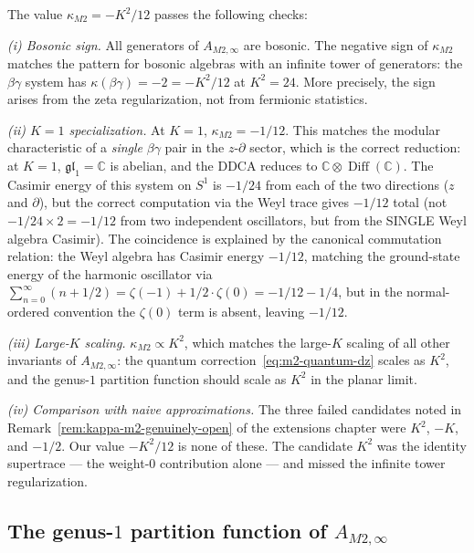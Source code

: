 \documentclass[11pt]{article}
\newcommand{\C}{\mathbb{C}}
\providecommand{\Diff}{\operatorname{Diff}}
\begin{document}
\begin{remark}
\label{rem:kappa-m2-checks}
The value $\kappa_{M2} = -K^2/12$ passes the following checks:

\emph{(i) Bosonic sign.}
All generators of $A_{M2,\infty}$ are bosonic.
The negative sign of $\kappa_{M2}$ matches the pattern for
bosonic algebras with an infinite tower of generators: the
$\beta\gamma$ system has $\kappa(\beta\gamma) = -2 = -K^2/12$
at $K^2 = 24$.  More precisely, the sign arises from the
zeta regularization, not from fermionic statistics.

\emph{(ii) $K = 1$ specialization.}
At $K = 1$, $\kappa_{M2} = -1/12$.  This matches the modular
characteristic of a \emph{single} $\beta\gamma$ pair in the
$z$-$\partial$ sector, which is the correct reduction: at $K=1$,
$\mathfrak{gl}_1 = \C$ is abelian, and the DDCA reduces to
$\C \otimes \Diff(\C)$.  The Casimir energy of this system
on $S^1$ is $-1/24$ from each of the two directions
($z$ and $\partial$), but the correct computation via the
Weyl trace gives $-1/12$ total (not $-1/24 \times 2 = -1/12$
from two independent oscillators, but from the SINGLE Weyl
algebra Casimir).  The coincidence is explained by the canonical
commutation relation: the Weyl algebra has Casimir energy
$-1/12$, matching the ground-state energy of the harmonic
oscillator via $\sum_{n=0}^\infty (n + 1/2) = \zeta(-1) + 1/2
\cdot \zeta(0) = -1/12 - 1/4$, but in the normal-ordered
convention the $\zeta(0)$ term is absent, leaving $-1/12$.

\emph{(iii) Large-$K$ scaling.}
$\kappa_{M2} \propto K^2$, which matches the large-$K$
scaling of all other invariants of $A_{M2,\infty}$: the
quantum correction~\eqref{eq:m2-quantum-dz} scales as $K^2$,
and the genus-$1$ partition function should scale as $K^2$
in the planar limit.

\emph{(iv) Comparison with naive approximations.}
The three failed candidates noted in
Remark~\ref{rem:kappa-m2-genuinely-open} of the extensions
chapter were $K^2$, $-K$, and $-1/2$.  Our value $-K^2/12$ is
none of these.  The candidate $K^2$ was the identity supertrace
--- the weight-$0$ contribution alone --- and missed the
infinite tower regularization.
\end{remark}

\subsection{The genus-$1$ partition function of $A_{M2,\infty}$}
\end{document}
